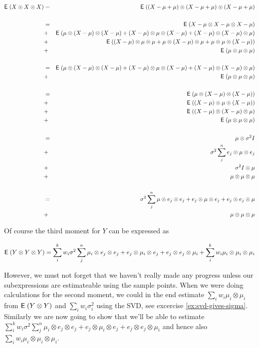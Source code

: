 \documentclass{book}
\numberwithin{exercise}{chapter}
\begin{document}

\newcommand{\tensor}[3]{
  \ensuremath{#1 \otimes #2 \otimes #3}
}

\newcommand{\tensorsame}[1]{
  \tensor{#1}{#1}{#1}
}

\newcommand{\perms}[2]{
  \tensor{#1}{#2}{#2} +
  \tensor{#2}{#1}{#2} +
  \tensor{#2}{#2}{#1}
}

\begin{eqnarray*}
  \E(X \otimes X \otimes X)
  &=& \E((X - \mu + \mu) \otimes (X - \mu + \mu) \otimes (X - \mu + \mu)
  \\ \\
  &=& \E(\tensorsame{X - \mu}) \\
  &+& \E(\perms{\mu}{(X - \mu)}) \\
  &+& \E(\perms{(X - \mu)}{\mu}) \\
  &+& \E(\tensorsame{\mu}) \\ \\
  &=& \E(\perms{\mu}{(X - \mu)}) \\
  &+& \E(\tensorsame{\mu}) \\ \\
  &=& \E(\tensor{\mu}{(X - \mu)}{(X - \mu)}) \\
  &+& \E(\tensor{(X - \mu)}{\mu}{(X - \mu)}) \\
  &+& \E(\tensor{(X - \mu)}{(X - \mu)}{\mu}) \\
  &+& \E(\tensorsame{\mu}) \\ \\
  &=& \mu \otimes \sigma^2 I \\
  &+& \sigma^2 \sum_j^n \tensor{e_j}{\mu}{e_j} \\
  &+& \sigma^2 I \otimes \mu \\
  &+& \tensorsame{\mu} \\ \\
  &=& \sigma^2 \sum_j^n \perms{\mu}{e_j} \\
  &+& \tensorsame{\mu} \\
\end{eqnarray*}

Of course the third moment for $Y$ can be expressed as

\[
  \E(Y \otimes Y \otimes Y) =
  \sum_i^k w_i \sigma^2 \sum_j^n \perms{\mu_i}{e_j} + \sum_i^k w_i \tensorsame{\mu_i}
\]

However, we must not forget that we haven't really made any progress
unless our subexpressions are estimateable using the sample points. When
we were doing calculations for the second moment, we could in the end
estimate $\sum_i w_i \mu_i \otimes \mu_i$ from $\hbox{{\sf E}\;}(Y \otimes Y)$ and
$\sum_i w_i \sigma_i^2$ using the SVD, see excercise
\ref{ex:svd-gives-sigma}. Similarly we are now going to show that we'll
be able to estimate $\sum_i^k w_i \sigma^2 \sum_j^n \perms{\mu_i}{e_j}$
and hence also $\sum_i w_i \tensorsame{\mu_i}$.
\end{document}
